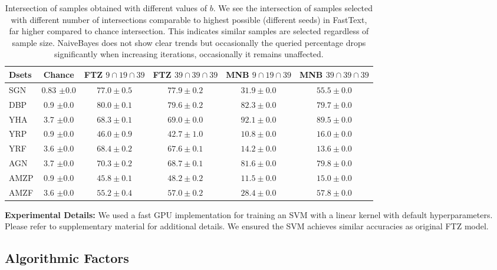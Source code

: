 \documentclass[11pt,a4paper]{article}
\begin{document}
\begin{table*}[t]
\vspace*{-0.2cm}
\small\addtolength{\tabcolsep}{-4pt}
\centering
\begin{tabular}{|l|c||c|c||c|c|}
\hline
Dsets & Chance & FTZ $9 \cap 19 \cap 39$ & FTZ $39 \cap 39  \cap 39$ & MNB $9 \cap 19  \cap 39$ & MNB $39  \cap 39 \cap 39$\\ \hline
SGN & 0.83 $\pm 0.0$ & $77.0 \pm 0.5$ & $77.9 \pm 0.2$ & $31.9 \pm 0.0$ & $55.5 \pm 0.0$ \\ \hline 
DBP & 0.9 $\pm 0.0$& $80.0 \pm 0.1$ & $79.6 \pm 0.2$ & $82.3 \pm 0.0$  & $79.7 \pm 0.0$ \\ \hline
YHA & 3.7 $\pm 0.0$& $68.3 \pm 0.1$ & $69.0 \pm 0.0$ & $92.1 \pm 0.0$ & $89.5 \pm 0.0$ \\ \hline 
YRP & 0.9 $\pm 0.0$& $46.0 \pm 0.9$ & $42.7 \pm 1.0$ & $10.8 \pm 0.0$ & $16.0 \pm 0.0$\\ \hline 
YRF & 3.6 $\pm 0.0$& $68.4 \pm 0.2$ & $67.6 \pm 0.1$ & $14.2 \pm 0.0$ & $13.6 \pm 0.0$ \\ \hline 
AGN & 3.7 $\pm 0.0$& $70.3 \pm 0.2$ & $68.7 \pm 0.1$ & $81.6 \pm 0.0$ & $79.8 \pm 0.0$ \\ \hline 
AMZP & 0.9 $\pm 0.0$& $45.8 \pm 0.1$ & $48.2 \pm 0.2$ & $11.5 \pm 0.0$ & $15.0 \pm 0.0$\\ \hline 
AMZF & 3.6 $\pm 0.0$& $55.2 \pm 0.4$ & $57.0 \pm 0.2$ & $28.4 \pm 0.0$ & $57.8 \pm 0.0$\\ \hline
\end{tabular}
\caption{Intersection of samples obtained with different values of $b$. We see the intersection of samples selected with different number of intersections comparable to highest possible (different seeds) in FastText, far higher compared to chance intersection. This indicates similar samples are selected regardless of sample size. NaiveBayes does not show clear trends but occasionally the queried percentage drops significantly when increasing iterations, occasionally it remains unaffected.} 
\label{tab:sampling_bias}
\end{table*}


\textbf{Experimental Details:} We used a fast GPU implementation for training an SVM with a linear kernel \cite{wen2018thundersvm} with  default hyperparameters. Please refer to supplementary material for additional details. We ensured the SVM achieves similar accuracies as original FTZ model.

\subsection{Algorithmic Factors}\label{sec:causes}
\end{document}
